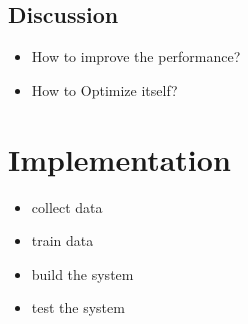 \documentclass[conference]{IEEEtran}
\begin{document}
\subsection{Discussion}
\begin{itemize}
    \item How to improve the performance?
    \item How to Optimize itself?
\end{itemize}






\section{Implementation}
\begin{itemize}
    \item collect data
    \item train data
    \item build the system
    \item test the system
\end{itemize}


\end{document}
